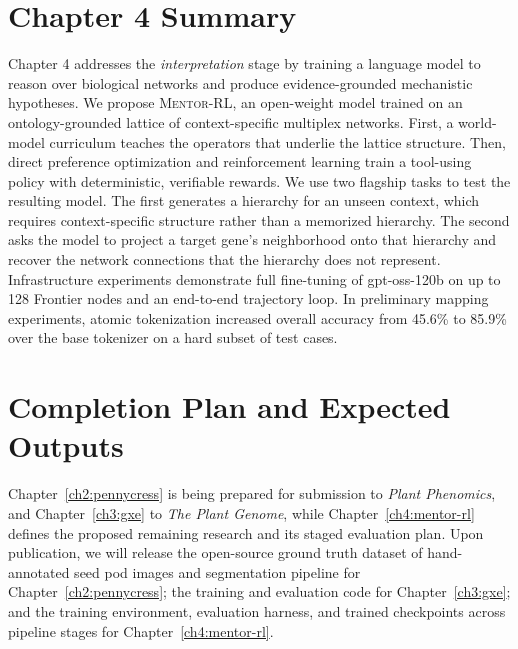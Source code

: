 \section*{Chapter 4 Summary}\label{sec:ch4}
Chapter 4 addresses the \textit{interpretation} stage by training a language model to reason over biological networks and produce evidence-grounded mechanistic hypotheses. We propose \textsc{Mentor-RL}, an open-weight model trained on an ontology-grounded lattice of context-specific multiplex networks. First, a world-model curriculum teaches the operators that underlie the lattice structure. Then, direct preference optimization and reinforcement learning train a tool-using policy with deterministic, verifiable rewards. We use two flagship tasks to test the resulting model. The first generates a hierarchy for an unseen context, which requires context-specific structure rather than a memorized hierarchy. The second asks the model to project a target gene's neighborhood onto that hierarchy and recover the network connections that the hierarchy does not represent. Infrastructure experiments demonstrate full fine-tuning of gpt-oss-120b on up to 128 Frontier nodes and an end-to-end trajectory loop. In preliminary mapping experiments, atomic tokenization increased overall accuracy from 45.6\% to 85.9\% over the base tokenizer on a hard subset of test cases.

\section*{Completion Plan and Expected Outputs}
Chapter~\ref{ch2:pennycress} is being prepared for submission to \textit{Plant Phenomics}, and Chapter~\ref{ch3:gxe} to \textit{The Plant Genome}, while Chapter~\ref{ch4:mentor-rl} defines the proposed remaining research and its staged evaluation plan. Upon publication, we will release the open-source ground truth dataset of hand-annotated seed pod images and segmentation pipeline for Chapter~\ref{ch2:pennycress}; the training and evaluation code for Chapter~\ref{ch3:gxe}; and the training environment, evaluation harness, and trained checkpoints across pipeline stages for Chapter~\ref{ch4:mentor-rl}.
